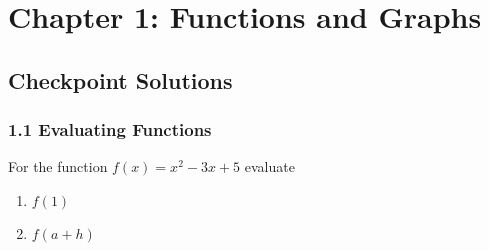 \documentclass{article}
\begin{document}
\section*{Chapter 1: Functions and Graphs}

\subsection*{Checkpoint Solutions}

\subsubsection*{1.1 Evaluating Functions}

For the function $ f(x) = x^2 - 3x + 5 $ evaluate

\begin{enumerate}[label=(\alph*)]
  \item $ f(1) $
  \item $ f(a + h) $
\end{enumerate}
\end{document}
